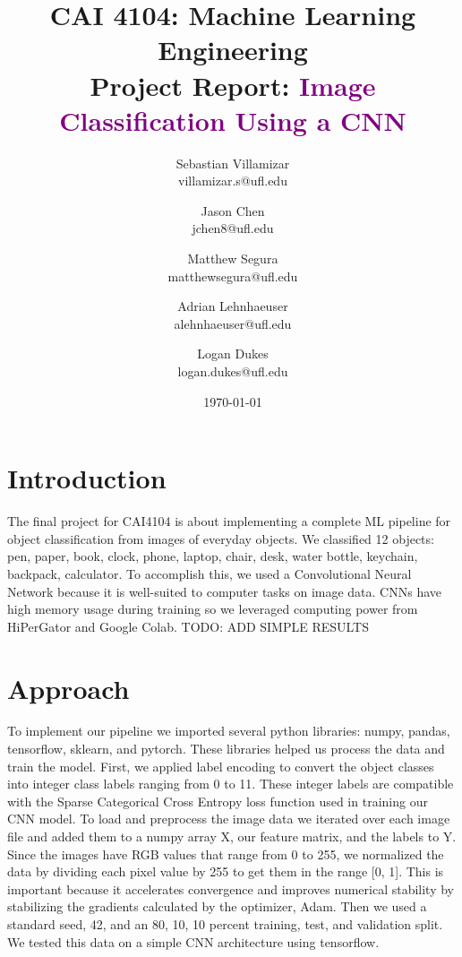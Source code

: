 \documentclass[10pt]{article}
\title{CAI 4104: Machine Learning Engineering\\
	\large Project Report:  {\textcolor{purple}{Image Classification Using a CNN}}} %
\author{
        Sebastian Villamizar \\
        villamizar.s@ufl.edu\\
        \and
        Jason Chen \\
        jchen8@ufl.edu\\
        \and
        Matthew Segura \\
        matthewsegura@ufl.edu\\
        \and
        Adrian Lehnhaeuser \\
        alehnhaeuser@ufl.edu\\
        \and
        Logan Dukes\\
        logan.dukes@ufl.edu\\
}
\date{\today}
\begin{document}

\maketitle






\section{Introduction}
The final project for CAI4104 is about implementing a complete ML pipeline for object classification from images of everyday objects. We classified 12 objects: pen, paper, book, clock, phone, laptop, chair, desk, water bottle, keychain, backpack, calculator. To accomplish this, we used a Convolutional Neural Network because it is well-suited to computer tasks on image data. CNNs have high memory usage during training so we leveraged computing power from HiPerGator and Google Colab. TODO: ADD SIMPLE RESULTS




\section{Approach}
To implement our pipeline we imported several python libraries: numpy, pandas, tensorflow, sklearn, and pytorch. These libraries helped us process the data and train the model. First, we applied label encoding to convert the object classes into integer class labels ranging from 0 to 11. These integer labels are compatible with the Sparse Categorical Cross Entropy loss function used in training our CNN model. To load and preprocess the image data we iterated over each image file and added them to a numpy array X, our feature matrix, and the labels to Y. Since the images have RGB values that range from 0 to 255, we normalized the data by dividing each pixel value by 255 to get them in the range [0, 1]. This is important because it accelerates convergence and improves numerical stability by stabilizing the gradients calculated by the optimizer, Adam. Then we used a standard seed, 42, and an 80, 10, 10 percent training, test, and validation split. We tested this data on a simple CNN architecture using tensorflow. 
\end{document}
